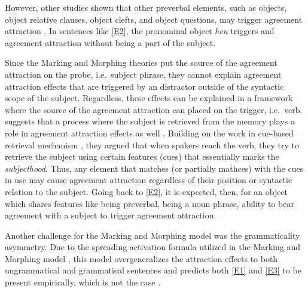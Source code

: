 \documentclass[doc]{apa6}
\begin{document}
However, other studies shown that other preverbal elements, such as objects, object relative clauses, object clefts, and object questions, may trigger agreement attraction \autocites{Kimball1971}{Hartsuiker2001}{Franck2006}[ among others]{Franck2015}. In sentences like \autoref{E2}, the pronominal object \emph{hen} triggers and agreement attraction without being a part of the subject.

\begin{exe}
\label{E2}
\end{exe}

Since the Marking and Morphing theories put the source of the agreement attraction on the probe, i.e.~subject phrase, they cannot explain agreement attraction effects that are triggered by an distractor outside of the syntactic scope of the subject. Regardless, these effects can be explained in a framework where the source of the agreement attraction can placed on the trigger, i.e.~verb. \textcite{Badecker2007} suggests that a process where the subject is retrieved from the memory plays a role in agreement attraction effects as well \autocite[see as well][]{Wagers2009}. Building on the work in cue-based retrieval mechanism \autocites{Gordon2001}{Lewis2005}[ among others]{Lewis2006}, they argued that when spakers reach the verb, they try to retrieve the subject using certain features (cues) that essentially marks the \emph{subjecthood}. Thus, any element that matches (or partially mathces) with the cues in use may cause agreement attraction regardless of their position or syntactic relation to the subject. Going back to \autoref{E2}, it is expected, then, for an object which shares features like being preverbal, being a noun phrase, ability to bear agreement with a subject to trigger agreement attraction.

Another challenge for the Marking and Morphing model was the grammaticality asymmetry. Due to the spreading activation formula utilized in the Marking and Morphing model \autocite[see][]{Dell1986}, this model overgeneralizes the attraction effects to both ungrammatical and grammatical sentences and predicts both \autoref{E1} and \autoref{E3} to be present empirically, which is not the case \autocite{Wagers2009}.

\begin{exe}
\label{E3}
\end{exe}
\end{document}
